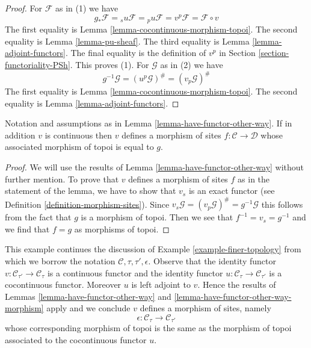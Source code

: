\begin{proof}
For $\mathcal{F}$ as in (1) we have
$$
g_*\mathcal{F} =
{}_su\mathcal{F} =
{}_pu\mathcal{F} =
v^p\mathcal{F} =
\mathcal{F} \circ v
$$
The first equality is Lemma \ref{lemma-cocontinuous-morphism-topoi}.
The second equality is Lemma \ref{lemma-pu-sheaf}.
The third equality is Lemma \ref{lemma-adjoint-functors}.
The final equality is the definition of $v^p$ in
Section \ref{section-functoriality-PSh}. This proves (1).
For $\mathcal{G}$ as in (2) we have
$$
g^{-1}\mathcal{G} = (u^p\mathcal{G})^\# = (v_p\mathcal{G})^\#
$$
The first equality is Lemma \ref{lemma-cocontinuous-morphism-topoi}.
The second equality is Lemma \ref{lemma-adjoint-functors}.
\end{proof}

\begin{lemma}
\label{lemma-have-functor-other-way-morphism}
Notation and assumptions as in Lemma \ref{lemma-have-functor-other-way}.
If in addition $v$ is continuous then $v$ defines a morphism of sites
$f : \mathcal{C} \to \mathcal{D}$ whose associated morphism
of topoi is equal to $g$.
\end{lemma}

\begin{proof}
We will use the results of Lemma \ref{lemma-have-functor-other-way}
without further mention. To prove that $v$ defines a morphism of sites
$f$ as in the statement of the lemma,
we have to show that $v_s$ is an exact functor (see
Definition \ref{definition-morphism-sites}). Since
$v_s\mathcal{G} = (v_p\mathcal{G})^\# = g^{-1}\mathcal{G}$
this follows from the fact that $g$ is a morphism of topoi.
Then we see that $f^{-1} = v_s = g^{-1}$ and we find that $f = g$
as morphisms of topoi.
\end{proof}

\begin{example}
\label{example-finer-topology-bis}
This example continues the discussion of
Example \ref{example-finer-topology}
from which we borrow the notation $\mathcal{C}, \tau, \tau', \epsilon$.
Observe that the identity functor $v : \mathcal{C}_{\tau'} \to \mathcal{C}_\tau$
is a continuous functor and the identity functor
$u : \mathcal{C}_\tau \to \mathcal{C}_{\tau'}$
is a cocontinuous functor. Moreover $u$ is left adjoint to $v$.
Hence the results of
Lemmas \ref{lemma-have-functor-other-way} and
\ref{lemma-have-functor-other-way-morphism}
apply and we conclude $v$ defines a morphism of sites, namely
$$
\epsilon : \mathcal{C}_\tau \longrightarrow \mathcal{C}_{\tau'}
$$
whose corresponding morphism of topoi is the same as the morphism
of topoi associated to the cocontinuous functor $u$.
\end{example}

